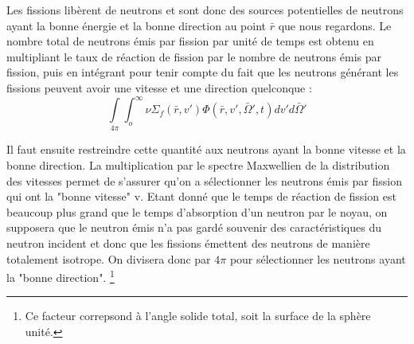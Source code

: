 Les fissions libèrent de neutrons et sont donc des sources potentielles de neutrons ayant 
la bonne énergie et la bonne direction au point $\bar r$ que nous regardons. Le nombre total de
neutrons émis par fission par unité de temps est obtenu en multipliant le taux de réaction
de fission par le nombre de neutrons émis par fission, puis en intégrant pour tenir
compte du fait que les neutrons générant les fissions peuvent avoir une vitesse
et une direction quelconque :
\begin{equation}
\int\limits_{4\pi }    \int_o^\infty     \nu {\Sigma _f}(\bar r,v')\varPhi (\bar r,v',\bar \Omega ',t)dv'd\bar \Omega '
\end{equation}

Il faut ensuite restreindre cette quantité aux neutrons ayant la bonne vitesse et la bonne direction.
La multiplication par le spectre Maxwellien de la distribution des vitesses permet de s'assurer
qu'on a sélectionner les neutrons émis par fission qui ont la "bonne vitesse" v.
Etant donné que le temps de réaction de fission est beaucoup plus grand que le temps d'absorption
d'un neutron par le noyau, on supposera que le neutron émis n'a pas gardé souvenir des caractéristiques
du neutron incident et donc que les fissions émettent des neutrons de manière totalement
isotrope. On divisera donc par $4\pi$ pour sélectionner les neutrons ayant la "bonne direction".
\footnote{Ce facteur correpsond à l'angle solide total, soit la surface de la sphère unité.}


